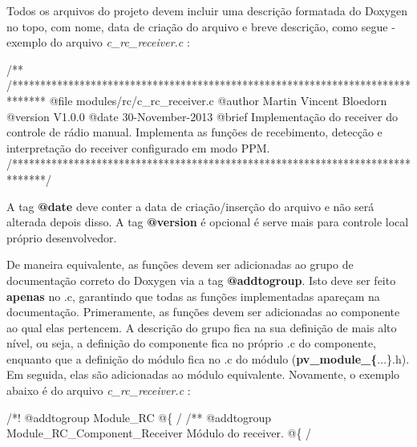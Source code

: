 Todos os arquivos do projeto devem incluir uma descrição formatada do Doxygen no topo, com nome, data de criação do arquivo e breve descrição, como segue -\/ exemplo do arquivo {\itshape c\-\_\-rc\-\_\-receiver.\-c} \-:


\begin{DoxyCode}
\textcolor{comment}{/**}
\textcolor{comment}{  /******************************************************************************}
\textcolor{comment}{    @file    modules/rc/c\_rc\_receiver.c}
\textcolor{comment}{    @author  Martin Vincent Bloedorn}
\textcolor{comment}{    @version V1.0.0}
\textcolor{comment}{    @date    30-November-2013}
\textcolor{comment}{    @brief   Implementação do receiver do controle de rádio manual.}
\textcolor{comment}{             Implementa as funções de recebimento, detecção e interpretação do}
\textcolor{comment}{             receiver configurado em modo PPM.}
\textcolor{comment}{  /******************************************************************************/}
\end{DoxyCode}


A tag {\bfseries @date} deve conter a data de criação/inserção do arquivo e não será alterada depois disso. A tag {\bfseries @version} é opcional é serve mais para controle local próprio desenvolvedor.

De maneira equivalente, as funções devem ser adicionadas ao grupo de documentação correto do Doxygen via a tag {\bfseries @addtogroup}. Isto deve ser feito {\bfseries apenas} no {\itshape }.c, garantindo que todas as funções implementadas apareçam na documentação. Primeramente, as funções devem ser adicionadas ao componente ao qual elas pertencem. A descrição do grupo fica na sua definição de mais alto nível, ou seja, a definição do componente fica no próprio {\itshape }.c do componente, enquanto que a definição do módulo fica no {\itshape }.c do módulo ({\bfseries pv\-\_\-module\-\_\-\{}...{\bfseries }\}.h). Em seguida, elas são adicionadas ao módulo equivalente. Novamente, o exemplo abaixo é do arquivo {\itshape c\-\_\-rc\-\_\-receiver.\-c} \-:


\begin{DoxyCode}
\textcolor{comment}{/*! @addtogroup Module\_RC}
\textcolor{comment}{    @\{}
\textcolor{comment}{   /}
\textcolor{comment}{  }\textcolor{comment}{}
\textcolor{comment}{/** @addtogroup Module\_RC\_Component\_Receiver}
\textcolor{comment}{  }
\textcolor{comment}{    Módulo do receiver.}
\textcolor{comment}{    @\{}
\textcolor{comment}{   /}
\end{DoxyCode}


